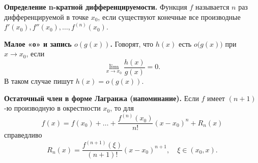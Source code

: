 
\textbf{Определение n-кратной дифференцируемости.}
Функция $f$ называется $n$ раз дифференцируемой в точке $x_0$, если существуют конечные все производные $f'(x_0), f''(x_0), \dots, f^{(n)}(x_0)$.

\medskip

\textbf{Малое «о» и запись $o(g(x))$.}
Говорят, что $h(x)$ есть $o\bigl(g(x)\bigr)$ при $x\to x_0$, если
\[
\lim_{x\to x_0}\frac{h(x)}{g(x)} = 0.
\]
В таком случае пишут $h(x)=o(g(x))$.

\medskip

\textbf{Остаточный член в форме Лагранжа (напоминание).}
Если $f$ имеет $(n+1)$-ю производную в окрестности $x_0$, то для
\[
f(x) = f(x_0) + \dots + \frac{f^{(n)}(x_0)}{n!}(x - x_0)^n + R_n(x)
\]
справедливо
\[
R_n(x) = \frac{f^{(n+1)}(\xi)}{(n+1)!}(x - x_0)^{n+1},\quad \xi \in (x_0,x).
\]

